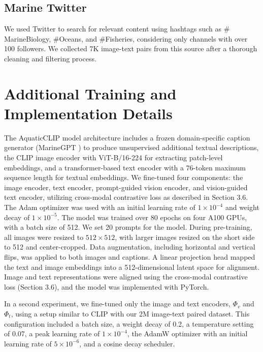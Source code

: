 \subsection{Marine Twitter} 
We used Twitter to search for relevant content using hashtags such as $\#$MarineBiology, $\#$Oceans, and $\#$Fisheries, considering only channels with over 100 followers. 
We collected 7K image-text pairs from this source after a thorough cleaning and filtering process.

\section{Additional Training and Implementation Details}
\label{training}
The AquaticCLIP model architecture includes a frozen domain-specific caption generator (MarineGPT \cite{zheng2023marinegpt}) to produce unsupervised additional textual descriptions, the CLIP \cite{radford2021learning} image encoder with ViT-B/16-224 \cite{dosovitskiy2020image} for extracting patch-level embeddings, and a transformer-based text encoder with a 76-token maximum sequence length \cite{radford2019language} for textual embeddings. 
We fine-tuned four components: the image encoder, text encoder, prompt-guided vision encoder, and vision-guided text encoder, utilizing cross-modal contrastive loss as described in Section 3.6.
The Adam optimizer \cite{loshchilov2017decoupled} was used with an initial learning rate of $1 \times 10^{-4}$ and weight decay of  $1 \times 10^{-5}$.
The model was trained over 80 epochs on four A100 GPUs, with a batch size of 512. 
We set 20 prompts for the model. 
During pre-training, all images were resized to $512 \times 512$, with larger images resized on the short side to 512 and center-cropped. 
Data augmentation, including horizontal and vertical flips, was applied to both images and captions. 
A linear projection head mapped the text and image embeddings into a 512-dimensional latent space for alignment. 
Image and text representations were aligned using the cross-modal contrastive loss (Section 3.6), and the model was implemented with PyTorch.

In a second experiment, we fine-tuned only the image and text encoders, $\Phi_{v}$ and $\Phi_{t}$, using a setup similar to CLIP \cite{radford2021learning} with our 2M image-text paired dataset. 
This configuration included a batch size, a weight decay of 0.2, a temperature setting of 0.07, a peak learning rate of $1 \times 10^{-4}$, the AdamW optimizer with an initial learning rate of $5 \times 10^{-6}$, and a cosine decay scheduler.



